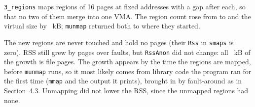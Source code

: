 \texttt{3\_regions} maps \RegAdded{} regions of 16 pages at fixed addresses with a
gap after each, so that no two of them merge into one VMA. The region count
rose from \RegBefore{} to \RegMapped{} and the virtual size by
\RegVirtualAddedKB{}~kB; \texttt{munmap} returned both to where they started.

The new regions are never touched and hold no pages (their \texttt{Rss} in
\texttt{smaps} is zero). RSS still grew by \RegRssGrowth{} pages over
\RegFaults{} faults, but \texttt{RssAnon} did not change: all
\RegRssFileGrowthKB{}~kB of the growth is file pages. The growth appears by the
time the regions are mapped, before \texttt{munmap} runs, so it most likely
comes from library code the program ran for the first time (\texttt{mmap} and
the output it prints), brought in by fault-around as in Section~4.3. Unmapping did not lower the RSS,
since the unmapped regions had none.
